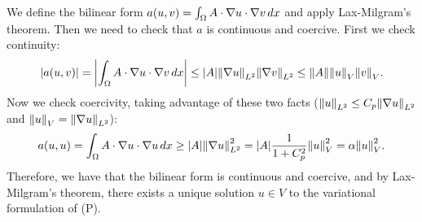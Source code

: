 We define the bilinear form \(a(u,v) = \int_{\Omega} A \cdot \nabla u \cdot \nabla v \, dx\) and apply Lax-Milgram's theorem. Then we need to check that \(a\) is continuous and coercive. First we check continuity:
\[
\abs{a(u,v)} = \abs{\int_{\Omega} A \cdot \nabla u \cdot \nabla v \, dx} \leq \abs{A} \norm{\nabla u}_{L^2} \norm{\nabla v}_{L^2} \leq \norm{A} \norm{u}_{V} \norm{v}_{V}.
\]
Now we check coercivity, taking advantage of these two facts (\(\norm{u}_{L^2} \leq C_p \norm{\nabla u}_{L^2}\) and \(\norm{u}_{V} = \norm{\nabla u}_{L^2}\)):
\[
a(u,u) = \int_{\Omega} A \cdot \nabla u \cdot \nabla u \, dx \geq \abs{A} \norm{\nabla u}_{L^2}^2 = \abs{A} \frac{1}{1 + C_p^2} \norm{u}_{V}^2 = \alpha \norm{u}_{V}^2.
\]
Therefore, we have that the bilinear form is continuous and coercive, and by Lax-Milgram's theorem, there exists a unique solution \(u \in V\) to the variational formulation of (P).

